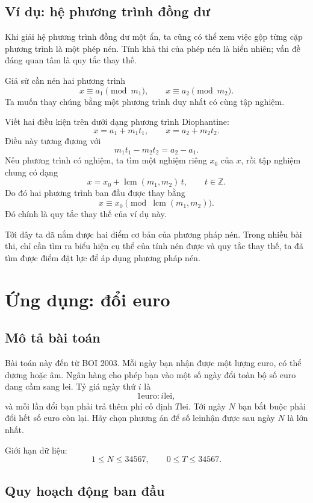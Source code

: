 \documentclass[11pt]{article}
\newcommand{\lei}{\ensuremath{\mathrm{lei}}}
\newcommand{\euro}{\ensuremath{\mathrm{euro}}}
\begin{document}
\subsection{Ví dụ: hệ phương trình đồng dư}

Khi giải hệ phương trình đồng dư một ẩn, ta cũng có thể xem việc gộp từng cặp
phương trình là một phép nén. Tính khả thi của phép nén là hiển nhiên; vấn đề
đáng quan tâm là quy tắc thay thế.

Giả sử cần nén hai phương trình
\[
  x \equiv a_1 \pmod{m_1}, \qquad
  x \equiv a_2 \pmod{m_2}.
\]
Ta muốn thay chúng bằng một phương trình duy nhất có cùng tập nghiệm.

Viết hai điều kiện trên dưới dạng phương trình Diophantine:
\[
  x = a_1 + m_1 t_1,\qquad
  x = a_2 + m_2 t_2.
\]
Điều này tương đương với
\[
  m_1 t_1 - m_2 t_2 = a_2-a_1.
\]
Nếu phương trình có nghiệm, ta tìm một nghiệm riêng $x_0$ của $x$, rồi tập
nghiệm chung có dạng
\[
  x = x_0 + \operatorname{lcm}(m_1,m_2)\,t,\qquad t\in\mathbb{Z}.
\]
Do đó hai phương trình ban đầu được thay bằng
\[
  x \equiv x_0 \pmod{\operatorname{lcm}(m_1,m_2)}.
\]
Đó chính là quy tắc thay thế của ví dụ này.

Tới đây ta đã nắm được hai điểm cơ bản của phương pháp nén. Trong nhiều bài
thi, chỉ cần tìm ra biểu hiện cụ thể của tính nén được và quy tắc thay thế,
ta đã tìm được điểm đặt lực để áp dụng phương pháp nén.

\section{Ứng dụng: đổi euro}

\subsection{Mô tả bài toán}

Bài toán này đến từ BOI 2003. Mỗi ngày bạn nhận được một lượng euro, có thể
dương hoặc âm. Ngân hàng cho phép bạn vào một số ngày đổi toàn bộ số euro đang
cầm sang \lei. Tỷ giá ngày thứ $i$ là
\[
  1\euro : i\lei,
\]
và mỗi lần đổi bạn phải trả thêm phí cố định $T\lei$. Tới ngày $N$ bạn bắt
buộc phải đổi hết số euro còn lại. Hãy chọn phương án để số \lei nhận được
sau ngày $N$ là lớn nhất.

Giới hạn dữ liệu:
\[
  1\le N\le 34567,\qquad 0\le T\le 34567.
\]

\subsection{Quy hoạch động ban đầu}
\end{document}
